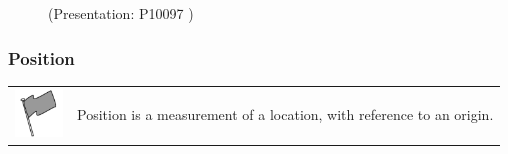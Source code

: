    \addtocounter{footnote}{-0}
    
         \label{m38787*eip-509}
    \setcounter{subfigure}{0}


	\begin{figure}[H] %
    
    \label{m38787*slidesharemedia}\label{m38787*slideshareflash} { (Presentation:  P10097 )}
      
      \vspace{2pt}
    \vspace{.1in}
    
    

 \end{figure}   

    \addtocounter{footnote}{-0}
    \par 
      
      \label{m38787*uid6}
            \subsubsection{ Position}
            \nopagebreak
            
        
\par
            \label{m38787*fhsst!!!underscore!!!id107}\begin{definition}
	  \begin{tabular*}{15 cm}{m{15 mm}m{}}
	\hspace*{-50pt}  \includegraphics[width=0.5in]{col11305.imgs/psflag2.png}   & \Definition{   \label{id2526538}\textbf{ Position }} { \label{m38787*meaningfhsst!!!underscore!!!id107}
        \label{m38787*id62726}Position is a measurement of a location, with reference to an origin. \par 
         } 
      \end{tabular*}
      \end{definition}

